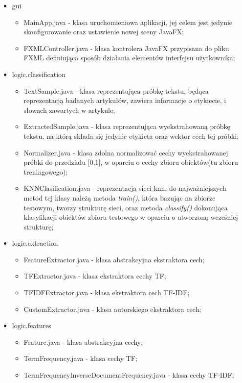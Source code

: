 \documentclass{classrep}
\begin{document}
\begin{itemize}
	\item gui
	\begin{itemize}
		\item MainApp.java - klasa uruchomieniowa aplikacji, jej celem jest jedynie skonfigurowanie oraz ustawienie nowej sceny JavaFX;
		\item FXMLController.java - klasa kontrolera JavaFX przypisana do pliku FXML definiująca sposób działania elementów interfejsu użytkownika;
	\end{itemize}
	\item logic.classification
	\begin{itemize}
		\item TextSample.java - klasa reprezentująca próbkę tekstu, będąca reprezentacją badanych artykułów, zawiera informacje o etykiecie, i słowach zawartych w artykule;
		\item ExtractedSample.java - klasa reprezentująca wyekstrahowaną próbkę tekstu, na którą składa się jedynie etykieta oraz wektor cech tej próbki;
		\item Normalizer.java - klasa zdolna normalizować cechy wyekstrahowanej próbki do przedziału [0,1], w oparciu o cechy zbioru obiektów(tu zbioru treningowego);
		\item KNNClasification.java - reprezentacja sieci knn, do najważniejszych metod tej klasy należą metoda \textit{train()}, która bazując na zbiorze testowym, tworzy strukturę sieci, oraz metoda \textit{classify()} dokonująca klasyfikacji obiektów zbioru testowego w oparciu o utworzoną wcześniej strukturę;
	\end{itemize}
	\item logic.extraction
	\begin{itemize}
		\item FeatureExtractor.java - klasa abstrakcyjna ekstraktora cech;
		\item TFExtractor.java - klasa ekstraktora cechy TF;
		\item TFIDFExtractor.java - klasa ekstraktora cech TF-IDF;
		\item CustomExtractor.java - klasa autorskiego ekstraktora cech;
	\end{itemize}
	\item logic.features
	\begin{itemize}
		\item Feature.java - klasa abstrakcyjna cechy;
		\item TermFrequency.java - klasa cechy TF;
		\item TermFrequencyInverseDocumentFrequency.java - klasa cechy TF-IDF; 

\end{itemize}
\end{itemize}
\end{document}
